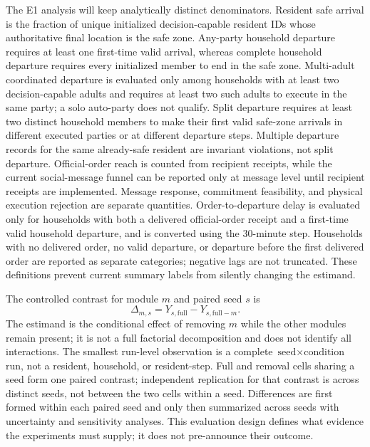 \documentclass[journal]{IEEEtran}
\begin{document}
The E1 analysis will keep analytically distinct denominators. Resident safe
arrival is the fraction of unique initialized decision-capable resident IDs
whose authoritative final location is the safe zone. Any-party household
departure requires at least one first-time valid arrival, whereas complete
household departure requires every initialized member to end in the safe zone.
Multi-adult coordinated departure is evaluated only among
households with at least two decision-capable adults and requires at least two
such adults to execute in the same party; a solo auto-party does not qualify.
Split departure requires at least two distinct household members to make their
first valid safe-zone arrivals in different executed parties or at different
departure steps. Multiple departure records for the same already-safe resident
are invariant violations, not split departure. Official-order reach is counted
from recipient receipts, while the current social-message funnel can be
reported only at message level until recipient receipts are implemented.
Message response, commitment feasibility, and physical execution rejection are
separate quantities. Order-to-departure delay is evaluated only for households
with both a delivered official-order receipt and a first-time valid household
departure, and is converted using the 30-minute step. Households with no
delivered order, no valid departure, or departure before the first delivered
order are reported as separate categories; negative lags are not truncated.
These definitions prevent current summary labels from silently changing the
estimand.

The controlled contrast for module $m$ and paired seed $s$ is
\begin{equation}
  \Delta_{m,s}=Y_{s,\mathrm{full}}-
  Y_{s,\mathrm{full}-m}.
  \label{eq:ablation}
\end{equation}
The estimand is the conditional effect of removing $m$ while the other modules
remain present; it is not a full factorial decomposition and does not identify
all interactions. The smallest run-level observation is a complete
$\text{seed}\times\text{condition}$ run, not a resident, household, or
resident-step. Full and removal cells sharing a seed form one paired contrast;
independent replication for that contrast is across distinct seeds, not between
the two cells within a seed. Differences are first formed within each paired
seed and only then summarized across seeds with uncertainty and sensitivity
analyses. This
evaluation design defines what evidence the experiments must supply; it does
not pre-announce their outcome.




\FloatBarrier
{\small


}
\end{document}
